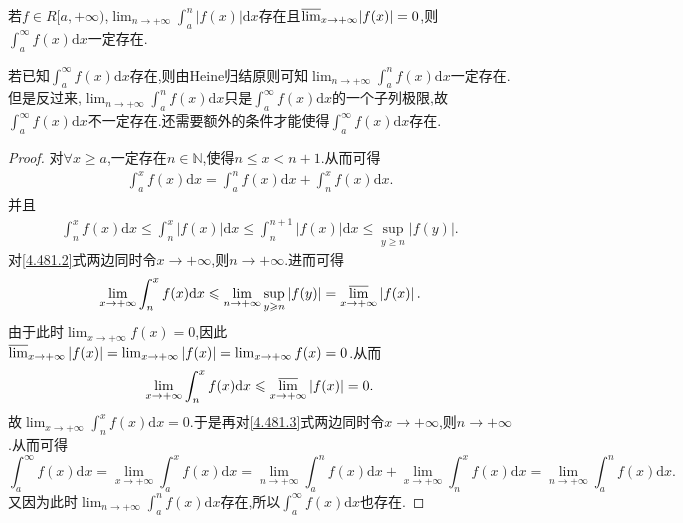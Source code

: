 \documentclass[../../main.tex]{subfiles}
\begin{document}
\begin{proposition}\label{proposition:反常积分与其子列极限存在命题}
若\(f\in R[a, +\infty)\),\(\lim_{n\rightarrow +\infty}\int_a^n|f(x)|\mathrm{d}x\)存在且\({\varlimsup_{x\rightarrow +\infty}}|f(x)| = 0\),则\(\int_a^{\infty}f(x)\mathrm{d}x\)一定存在.
\end{proposition}
\begin{note}
若已知$\int_a^{\infty}f(x)\mathrm{d}x$存在,则由Heine归结原则可知\(\lim_{n\rightarrow +\infty}\int_a^n f(x)\mathrm{d}x\)一定存在.但是反过来,\(\lim_{n\rightarrow +\infty}\int_a^n f(x)\mathrm{d}x\)只是$\int_a^{\infty}f(x)\mathrm{d}x$的一个子列极限,故$\int_a^{\infty}f(x)\mathrm{d}x$不一定存在.还需要额外的条件才能使得$\int_a^{\infty}f(x)\mathrm{d}x$存在.
\end{note}
\begin{proof}
对\(\forall x\geqslant a\),一定存在\(n\in\mathbb{N}\),使得\(n\leqslant x < n + 1\).从而可得
\begin{align}\label{4.481.3}
\int_a^x f(x)\mathrm{d}x=\int_a^n f(x)\mathrm{d}x+\int_n^x f(x)\mathrm{d}x. 
\end{align}
并且
\begin{align}\label{4.481.2}
\int_n^x f(x)\mathrm{d}x\leqslant\int_n^x\left|f(x)\right|\mathrm{d}x\leqslant\int_n^{n + 1}\left|f(x)\right|\mathrm{d}x\leqslant\sup_{y\geqslant n}\left|f(y)\right|.
\end{align}
对\eqref{4.481.2}式两边同时令\(x\rightarrow +\infty\),则\(n\rightarrow +\infty\).进而可得
\[
\lim_{x\rightarrow +\infty}\int_n^x f(x)\mathrm{d}x\leqslant\lim_{n\rightarrow +\infty}\sup_{y\geqslant n}\left|f(y)\right|={\varlimsup_{x\rightarrow +\infty}}\left|f(x)\right|.
\]
由于此时\(\lim_{x\rightarrow +\infty}f(x)=0\),因此\({\varlimsup_{x\rightarrow +\infty}}\left|f(x)\right|=\lim_{x\rightarrow +\infty}\left|f(x)\right|=\lim_{x\rightarrow +\infty}f(x)=0\).从而
\[
\lim_{x\rightarrow +\infty}\int_n^x f(x)\mathrm{d}x\leqslant{\varlimsup_{x\rightarrow +\infty}}\left|f(x)\right|=0.
\]
故\(\lim_{x\rightarrow +\infty}\int_n^x f(x)\mathrm{d}x = 0\).于是再对\eqref{4.481.3}式两边同时令\(x\rightarrow +\infty\),则\(n\rightarrow +\infty\).从而可得
\[
\int_a^{\infty}f(x)\mathrm{d}x=\lim_{x\rightarrow +\infty}\int_a^x f(x)\mathrm{d}x=\lim_{n\rightarrow +\infty}\int_a^n f(x)\mathrm{d}x+\lim_{x\rightarrow +\infty}\int_n^x f(x)\mathrm{d}x=\lim_{n\rightarrow +\infty}\int_a^n f(x)\mathrm{d}x.
\]
又因为此时\(\lim_{n\rightarrow +\infty}\int_a^n f(x)\mathrm{d}x\)存在,所以\(\int_a^{\infty}f(x)\mathrm{d}x\)也存在.
\end{proof}
\end{document}
